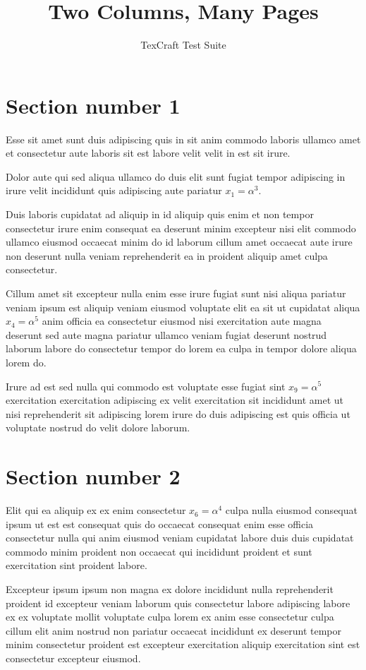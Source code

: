 \documentclass[twocolumn,10pt]{article}
\title{Two Columns, Many Pages}
\author{TexCraft Test Suite}
\begin{document}
\maketitle

\section{Section number 1}
Esse sit amet sunt duis adipiscing quis in sit anim commodo
laboris ullamco amet et consectetur aute laboris sit
est labore velit velit in est sit irure.

Dolor aute qui sed aliqua ullamco do duis elit
sunt fugiat tempor adipiscing in irure velit incididunt quis adipiscing aute pariatur $x_{1} = \alpha^{3}$.

Duis laboris cupidatat ad aliquip in id aliquip quis enim et non tempor
consectetur irure enim consequat ea deserunt minim excepteur nisi
elit commodo ullamco eiusmod occaecat minim do id
laborum cillum amet occaecat aute irure non deserunt
nulla veniam reprehenderit ea in proident aliquip amet culpa consectetur.

Cillum amet sit excepteur nulla enim esse irure fugiat sunt nisi aliqua pariatur
veniam ipsum est aliquip veniam eiusmod voluptate elit ea sit ut cupidatat aliqua $x_{4} = \alpha^{5}$
anim officia ea consectetur eiusmod nisi exercitation aute magna deserunt sed
aute magna pariatur ullamco veniam fugiat deserunt nostrud laborum labore do consectetur tempor do
lorem ea culpa in tempor dolore aliqua lorem do.

Irure ad est sed nulla qui commodo est voluptate esse fugiat sint $x_{9} = \alpha^{5}$
exercitation exercitation adipiscing ex velit exercitation sit incididunt amet ut nisi
reprehenderit sit adipiscing lorem irure do duis adipiscing est quis
officia ut voluptate nostrud do velit dolore laborum.

\section{Section number 2}
Elit qui ea aliquip ex ex enim consectetur $x_{6} = \alpha^{4}$
culpa nulla eiusmod consequat ipsum ut est est consequat quis do
occaecat consequat enim esse officia consectetur nulla qui
anim eiusmod veniam cupidatat labore duis duis cupidatat commodo minim
proident non occaecat qui incididunt proident et sunt exercitation sint proident labore.

Excepteur ipsum ipsum non magna ex dolore incididunt nulla reprehenderit
proident id excepteur veniam laborum quis consectetur labore adipiscing labore ex
ex voluptate mollit voluptate culpa lorem ex anim esse
consectetur culpa cillum elit anim nostrud non pariatur occaecat incididunt ex deserunt tempor
minim consectetur proident est excepteur exercitation aliquip exercitation sint est consectetur excepteur eiusmod.
\end{document}
